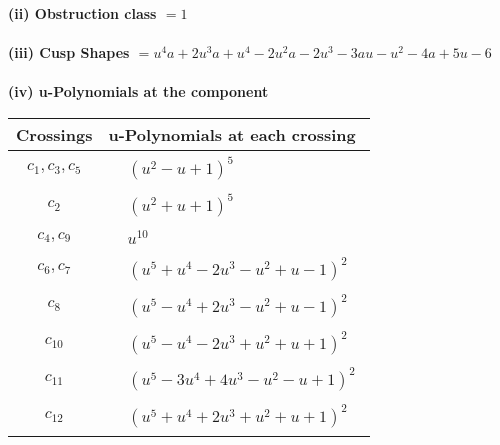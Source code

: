\documentclass[1p]{elsarticle_modified}
\theoremstyle{definition}
\begin{document}
\flushleft \textbf{(ii) Obstruction class $= 1$}\\~\\
\flushleft \textbf{(iii) Cusp Shapes $= u^4 a+2 u^3 a+u^4-2 u^2 a-2 u^3-3 a u- u^2-4 a+5 u-6$}\\~\\
\newpage\renewcommand{\arraystretch}{1}
\flushleft \textbf{(iv) u-Polynomials at the component}\newline \\
\begin{tabular}{m{50pt}|m{274pt}}
Crossings & \hspace{64pt}u-Polynomials at each crossing \\
\hline $$\begin{aligned}c_{1},c_{3},c_{5}\end{aligned}$$&$\begin{aligned}
&(u^2- u+1)^5
\end{aligned}$\\
\hline $$\begin{aligned}c_{2}\end{aligned}$$&$\begin{aligned}
&(u^2+u+1)^5
\end{aligned}$\\
\hline $$\begin{aligned}c_{4},c_{9}\end{aligned}$$&$\begin{aligned}
&u^{10}
\end{aligned}$\\
\hline $$\begin{aligned}c_{6},c_{7}\end{aligned}$$&$\begin{aligned}
&(u^5+u^4-2 u^3- u^2+u-1)^2
\end{aligned}$\\
\hline $$\begin{aligned}c_{8}\end{aligned}$$&$\begin{aligned}
&(u^5- u^4+2 u^3- u^2+u-1)^2
\end{aligned}$\\
\hline $$\begin{aligned}c_{10}\end{aligned}$$&$\begin{aligned}
&(u^5- u^4-2 u^3+u^2+u+1)^2
\end{aligned}$\\
\hline $$\begin{aligned}c_{11}\end{aligned}$$&$\begin{aligned}
&(u^5-3 u^4+4 u^3- u^2- u+1)^2
\end{aligned}$\\
\hline $$\begin{aligned}c_{12}\end{aligned}$$&$\begin{aligned}
&(u^5+u^4+2 u^3+u^2+u+1)^2
\end{aligned}$\\
\hline
\end{tabular}\\~\\
\end{document}
